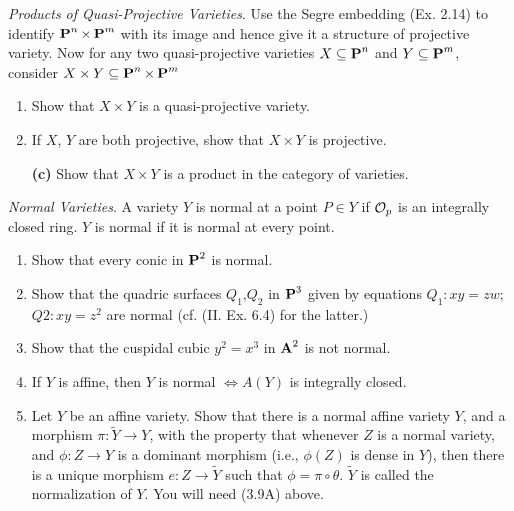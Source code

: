 \documentclass[10pt]{amsart}
\begin{document}
\begin{exercise}[3.16]
    \emph{Products of Quasi-Projective Varieties}. Use the Segre embedding (Ex. 2.14) to identify $\pp^n \times \pp^m$ 
    with its image and hence give it a structure of projective variety. Now for any two quasi-projective varieties 
    $X \subseteq \pp^n$ and $Y \subseteq \pp^m$, consider $X \times Y \subseteq \pp^n \times \pp^m$
    \begin{enumerate}[itemsep=2pt]
        \item Show that $X \times Y$ is a quasi-projective variety.
        \item If $X$, $Y$ are both projective, show that $X \times Y$ is projective.
        \item[{\bf *(c)}] Show that $X \times Y$ is a product in the category of varieties.
    \end{enumerate}
\end{exercise}

\begin{exercise}[3.17]
    \emph{Normal Varieties}. A variety $Y$ is normal at a point $P \in Y$ if $\cO_p$ is an integrally closed ring. 
    $Y$ is normal if it is normal at every point.
    \begin{enumerate}[itemsep=2pt]
        \item Show that every conic in $\pp^2$ is normal.
        \item Show that the quadric surfaces $Q_1$,$Q_2$ in $\pp^3$ given by equations $Q_1 :xy = zw$;
        $Q2 :xy = z^2$ are normal (cf. (II. Ex. 6.4) for the latter.)
        \item Show that the cuspidal cubic $y^2 = x^3$ in $\aa^2$ is not normal.
        \item If $Y$ is affine, then $Y$ is normal $\iff A(Y)$ is integrally closed.
        \item Let $Y$ be an affine variety. Show that there is a normal affine variety $Y$, and a
        morphism $\pi: \tilde{Y} \to Y$, with the property that whenever $Z$ is a normal variety, and 
        $\phi : Z \to Y$ is a dominant morphism (i.e., $\phi(Z)$ is dense in $Y$), then there is a unique 
        morphism $e:Z \to \tilde{Y}$ such that $\phi = \pi \circ \theta$. $\tilde{Y}$ is called the 
        normalization of $Y$. You will need (3.9A) above.
    \end{enumerate}
\end{exercise}
\end{document}
